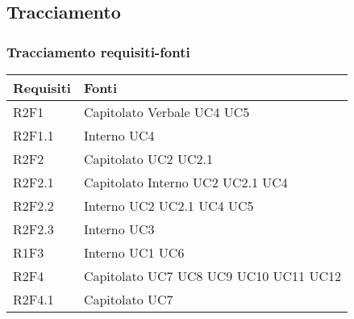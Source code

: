 \subsection{Tracciamento}
\label{sec:tracciamento}
\subsubsection{Tracciamento requisiti-fonti}
\begin{center}
	\renewcommand{\arraystretch}{1.5}
	\begin{longtable}{  p{5cm} p{5cm} }
		\rowcolor{tableHeadYellow}
		\textbf{Requisiti} & \textbf{Fonti} \\
		\endhead 
		
		R2F1 & Capitolato \newline Verbale \newline UC4 \newline UC5 \\
		R2F1.1 & Interno \newline UC4 \\
		R2F2 & Capitolato \newline UC2 \newline UC2.1 \\
		R2F2.1 & Capitolato \newline Interno \newline UC2 \newline UC2.1 \newline UC4 \\
		R2F2.2 & Interno \newline UC2 \newline UC2.1 \newline UC4 \newline UC5 \\
		R2F2.3 & Interno \newline UC3 \\
		R1F3 & Interno \newline UC1 \newline UC6 \\
		R2F4 & Capitolato \newline UC7 \newline UC8 \newline UC9 \newline UC10 \newline UC11 \newline UC12 \\
		R2F4.1 & Capitolato \newline UC7 \\

\end{longtable}
\end{center}
